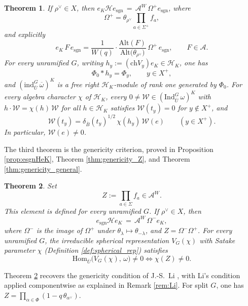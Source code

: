 \documentclass[12pt]{article}
\numberwithin{equation}{section}
\theoremstyle{definition}
\theoremstyle{remark}
\theoremstyle{plain}
\newtheorem{thmx}{Theorem}
\begin{document}
\begin{thmx}\label{thmx:CS}
If $\rho^\vee\in X$, then
$e_{K}\mathcal{H}e_{\mathrm{sgn}} \,=\, \mathcal{A}^{W}\,\Omega^{+}e_{\mathrm{sgn}}$, where
$$\Omega^{+} = \theta_{\rho^\vee} \prod_{a \in \Sigma^+} f_a,$$
and explicitly
\begin{equation}\label{eq:bbf_intro}
e_{K}\,F\,e_{\mathrm{sgn}} = \frac{1}{W(q)}\cdot\frac{\mathrm{Alt}(F)}{\mathrm{Alt}\big(\theta_{\rho^{\vee}}\big)}\,\Omega^{+}\, e_{\mathrm{sgn}}, \qquad F \in \mathcal{A}.
\end{equation}
For every unramified $G$, writing $h_y := (\mathrm{ch}V_y)e_K \in \mathcal{H}_K$, one has
$$\Phi_0 * h_y = \Phi_y, \qquad y \in X^+,$$
and $(\mathrm{ind}_{\overline{U}}^{G}\,\overline{\omega})^K$ is a free right $\mathcal{H}_K$-module of rank one generated by $\Phi_0$. For every algebra character $\chi$ of $\mathcal{H}_K$, every $0 \neq \mathcal{W} \in (\mathrm{Ind}_{\overline{U}}^{G}\,\omega)^K$ with $h \cdot \mathcal{W} = \chi(h)\,\mathcal{W}$ for all $h \in \mathcal{H}_K$ satisfies $\mathcal{W}(t_y) = 0$ for $y \notin X^+$, and
\[
\mathcal{W}(t_y) = \delta_{\overline{B}}(t_y)^{1/2}\,\chi(h_y)\,\mathcal{W}(e) \qquad (y \in X^+).
\]
In particular, $\mathcal{W}(e) \neq 0$.
\end{thmx}

The third theorem is the genericity criterion, proved in Proposition \ref{prop:esgnHeK}, Theorem \ref{thm:genericity_Z}, and Theorem \ref{thm:genericity_general}.

\begin{thmx}\label{thmx:genericity}
Set
\begin{equation}\label{eq:Z_intro}
Z := \prod_{a \in \Sigma} f_a \in \mathcal{A}^W.
\end{equation}
This element is defined for every unramified $G$. If $\rho^\vee\in X$, then
$$e_{\mathrm{sgn}}\mathcal{H}e_{K} \,=\, \mathcal{A}^{W}\,\Omega^{-}e_{K},$$
where $\Omega^{-}$ is the image of $\Omega^{+}$ under $\theta_\lambda \mapsto \theta_{-\lambda}$, and $Z=\Omega^{-}\Omega^{+}$. For every unramified $G$, the irreducible spherical representation $V_G(\chi)$ with Satake parameter $\chi$ (Definition \ref{def:spherical_rep}) satisfies
$$\mathrm{Hom}_{\overline{U}}\big(V_G(\chi),\, \omega\big) \neq 0 \iff \chi(Z) \neq 0.$$
\end{thmx}

Theorem \ref{thmx:genericity} recovers the genericity condition of J.-S.\ Li \cite[Theorem 2.2]{Li92}, with Li's condition applied componentwise as explained in Remark \ref{rem:Li}. For split $G$, one has $Z = \prod_{\alpha \in \Phi}(1 - q\,\theta_{\alpha^\vee})$.
\end{document}
